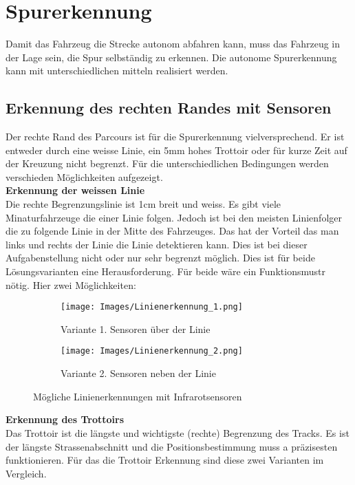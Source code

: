 \section{Spurerkennung}
Damit das Fahrzeug die Strecke autonom abfahren kann, muss das Fahrzeug in der Lage sein, die Spur selbständig zu erkennen.
Die autonome Spurerkennung kann mit unterschiedlichen mitteln realisiert werden.

\subsection{Erkennung des rechten Randes mit Sensoren}
Der rechte Rand des Parcours ist für die Spurerkennung vielversprechend. Er ist entweder durch eine weisse Linie, ein 5mm hohes Trottoir oder für kurze Zeit auf der Kreuzung nicht begrenzt.
Für die unterschiedlichen Bedingungen werden verschieden Möglichkeiten aufgezeigt.\\

\textbf {Erkennung der weissen Linie} \\
Die rechte Begrenzungslinie ist 1cm breit und weiss. Es gibt viele Minaturfahrzeuge die einer Linie folgen. Jedoch ist bei den meisten Linienfolger die zu folgende Linie in der Mitte des Fahrzeuges. Das hat der Vorteil das man links und rechts der Linie die Linie detektieren kann. Dies ist bei dieser Aufgabenstellung nicht oder nur sehr begrenzt möglich. Dies ist für beide Lösungsvarianten eine Herausforderung. Für beide wäre ein Funktionsmustr nötig.
Hier zwei Möglichkeiten:

\begin{figure} [hbp]
	\centering
	\begin{subfigure}[b]{0.4\textwidth}
		\texttt{[image: Images/Linienerkennung\_1.png]}
		\caption{Variante 1. Sensoren über der Linie}
	\end{subfigure}
	\hfill
	\begin{subfigure}[b]{0.42\textwidth}
		\texttt{[image: Images/Linienerkennung\_2.png]}
		\caption{Variante 2. Sensoren neben der Linie}
\end{subfigure}
	\caption{Mögliche Linienerkennungen mit Infrarotsensoren}\label{fig:animals}
\end{figure}


\textbf {Erkennung des Trottoirs} \\
Das Trottoir ist die längste und wichtigste (rechte) Begrenzung des Tracks. Es ist der längste Strassenabschnitt und die Positionsbestimmung muss a präzisesten funktionieren. Für das die Trottoir Erkennung sind diese zwei Varianten im Vergleich.
 
